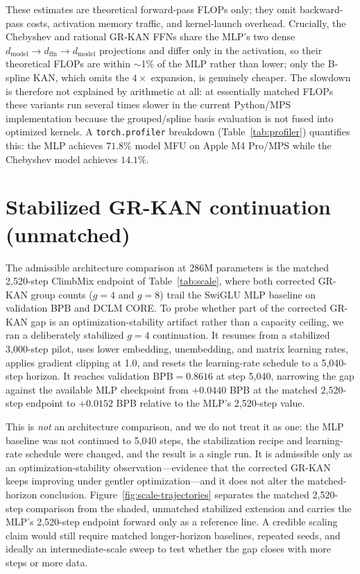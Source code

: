 \documentclass[11pt]{article}
\newcommand{\modelname}[1]{\textsc{#1}}
\newcommand{\bpb}{\mathrm{BPB}}
\newcommand{\grkan}{\modelname{GR-KAN}}
\begin{document}
These estimates are theoretical forward-pass FLOPs only; they omit backward-pass costs, activation memory traffic, and kernel-launch overhead. Crucially, the Chebyshev and rational \grkan{} FFNs share the MLP's two dense \(d_{\mathrm{model}}\!\to\!d_{\mathrm{ffn}}\!\to\!d_{\mathrm{model}}\) projections and differ only in the activation, so their theoretical FLOPs are within \(\sim\)1\% of the MLP rather than lower; only the B-spline KAN, which omits the \(4\times\) expansion, is genuinely cheaper. The slowdown is therefore not explained by arithmetic at all: at essentially matched FLOPs these variants run several times slower in the current Python/MPS implementation because the grouped/spline basis evaluation is not fused into optimized kernels. A \texttt{torch.profiler} breakdown (Table~\ref{tab:profiler}) quantifies this: the MLP achieves \(71.8\%\) model MFU on Apple M4 Pro/MPS while the Chebyshev model achieves \(14.1\%\).

\section{Stabilized GR-KAN continuation (unmatched)}
\label{app:continuation}

The admissible architecture comparison at 286M parameters is the matched 2,520-step ClimbMix endpoint of Table~\ref{tab:scale}, where both corrected \grkan{} group counts (\(g=4\) and \(g=8\)) trail the SwiGLU MLP baseline on validation BPB and DCLM CORE. To probe whether part of the corrected \grkan{} gap is an optimization-stability artifact rather than a capacity ceiling, we ran a deliberately stabilized \(g=4\) continuation. It resumes from a stabilized 3,000-step pilot, uses lower embedding, unembedding, and matrix learning rates, applies gradient clipping at 1.0, and resets the learning-rate schedule to a 5,040-step horizon. It reaches validation \(\bpb=0.8616\) at step 5,040, narrowing the gap against the available MLP checkpoint from \(+0.0440\) BPB at the matched 2,520-step endpoint to \(+0.0152\) BPB relative to the MLP's 2,520-step value.

This is \emph{not} an architecture comparison, and we do not treat it as one: the MLP baseline was not continued to 5,040 steps, the stabilization recipe and learning-rate schedule were changed, and the result is a single run. It is admissible only as an optimization-stability observation---evidence that the corrected \grkan{} keeps improving under gentler optimization---and it does not alter the matched-horizon conclusion. Figure~\ref{fig:scale-trajectories} separates the matched 2,520-step comparison from the shaded, unmatched stabilized extension and carries the MLP's 2,520-step endpoint forward only as a reference line. A credible scaling claim would still require matched longer-horizon baselines, repeated seeds, and ideally an intermediate-scale sweep to test whether the gap closes with more steps or more data.
\end{document}
